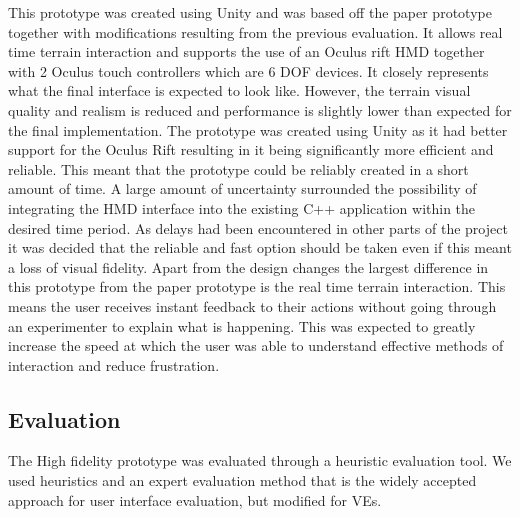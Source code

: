 \documentclass{sig-alternate-05-2015}
\begin{document}
This prototype was created using Unity and was based off the paper prototype together with modifications resulting from the previous evaluation. It allows real time terrain interaction and supports the use of an Oculus rift HMD together with 2 Oculus touch controllers which are 6 DOF devices. It closely represents what the final interface is expected to look like. However, the terrain visual quality and realism is reduced and performance is slightly lower than expected for the final implementation.
\newline\newline
The prototype was created using Unity as it had better support for the Oculus Rift resulting in it being significantly more efficient and reliable. This meant that the prototype could be reliably created in a short amount of time. A large amount of uncertainty surrounded the possibility of integrating the HMD interface into the existing C++ application within the desired time period. As delays had been encountered in other parts of the project it was decided that the reliable and fast option should be taken even if this meant a loss of visual fidelity.
\newline\newline
Apart from the design changes the largest difference in this prototype from the paper prototype is the real time terrain interaction. This means the user receives instant feedback to their actions without going through an experimenter to explain what is happening. This was expected to greatly increase the speed at which the user was able to understand effective methods of interaction and reduce frustration.


\subsection{Evaluation}
The High fidelity prototype was evaluated through a heuristic evaluation tool\cite{Bowman2002}. We used heuristics and an expert evaluation method that is the widely accepted approach for user interface evaluation, but modified for VEs\cite{Sutcliffe2004}.



\end{document}
